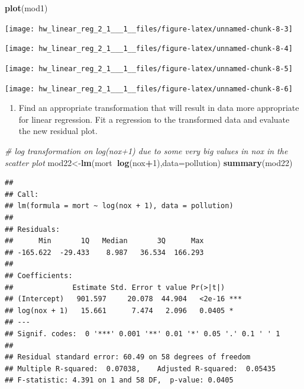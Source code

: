 \documentclass[]{article}
\newenvironment{Shaded}{\begin{snugshade}}{\end{snugshade}}
\newcommand{\KeywordTok}[1]{\textcolor[rgb]{0.13,0.29,0.53}{\textbf{#1}}}
\newcommand{\DataTypeTok}[1]{\textcolor[rgb]{0.13,0.29,0.53}{#1}}
\newcommand{\DecValTok}[1]{\textcolor[rgb]{0.00,0.00,0.81}{#1}}
\newcommand{\CommentTok}[1]{\textcolor[rgb]{0.56,0.35,0.01}{\textit{#1}}}
\newcommand{\OperatorTok}[1]{\textcolor[rgb]{0.81,0.36,0.00}{\textbf{#1}}}
\newcommand{\NormalTok}[1]{#1}
\providecommand{\tightlist}{%
  \setlength{\itemsep}{0pt}\setlength{\parskip}{0pt}}
\begin{document}
\begin{Shaded}
\begin{Highlighting}[]
\KeywordTok{plot}\NormalTok{(mod1)}
\end{Highlighting}
\end{Shaded}

\begin{center}\texttt{[image: hw\_linear\_reg\_2\_1\_\_\_1\_\_files/figure-latex/unnamed-chunk-8-3]} \end{center}

\begin{center}\texttt{[image: hw\_linear\_reg\_2\_1\_\_\_1\_\_files/figure-latex/unnamed-chunk-8-4]} \end{center}

\begin{center}\texttt{[image: hw\_linear\_reg\_2\_1\_\_\_1\_\_files/figure-latex/unnamed-chunk-8-5]} \end{center}

\begin{center}\texttt{[image: hw\_linear\_reg\_2\_1\_\_\_1\_\_files/figure-latex/unnamed-chunk-8-6]} \end{center}

\begin{enumerate}
\def\labelenumi{\arabic{enumi}.}
\setcounter{enumi}{1}
\tightlist
\item
  Find an appropriate transformation that will result in data more
  appropriate for linear regression. Fit a regression to the transformed
  data and evaluate the new residual plot.
\end{enumerate}

\begin{Shaded}
\begin{Highlighting}[]
\CommentTok{# log transformation on log(nox+1) due to some very big values in nox in the scatter plot}
\NormalTok{mod22<-}\KeywordTok{lm}\NormalTok{(mort}\OperatorTok{~}\KeywordTok{log}\NormalTok{(nox}\OperatorTok{+}\DecValTok{1}\NormalTok{),}\DataTypeTok{data=}\NormalTok{pollution)}
\KeywordTok{summary}\NormalTok{(mod22)}
\end{Highlighting}
\end{Shaded}

\begin{verbatim}
## 
## Call:
## lm(formula = mort ~ log(nox + 1), data = pollution)
## 
## Residuals:
##      Min       1Q   Median       3Q      Max 
## -165.622  -29.433    8.987   36.534  166.293 
## 
## Coefficients:
##              Estimate Std. Error t value Pr(>|t|)    
## (Intercept)   901.597     20.078  44.904   <2e-16 ***
## log(nox + 1)   15.661      7.474   2.096   0.0405 *  
## ---
## Signif. codes:  0 '***' 0.001 '**' 0.01 '*' 0.05 '.' 0.1 ' ' 1
## 
## Residual standard error: 60.49 on 58 degrees of freedom
## Multiple R-squared:  0.07038,    Adjusted R-squared:  0.05435 
## F-statistic: 4.391 on 1 and 58 DF,  p-value: 0.0405
\end{verbatim}
\end{document}
